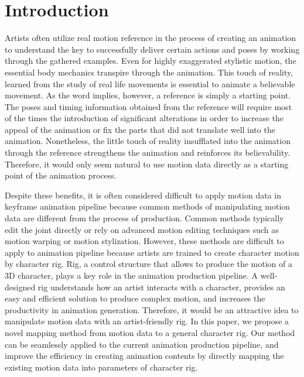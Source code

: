\section{Introduction}

Artists often utilize real motion reference in the process of creating an animation to understand the key to successfully deliver certain actions and poses by working through the gathered examples. 
Even for highly exaggerated stylistic motion, the essential body mechanics transpire through the animation. 
This touch of reality, learned from the study of real life movements is essential to animate a believable movement. 
As the word implies, however, a reference is simply a starting point. 
The poses and timing information obtained from the reference will require most of the times the introduction of significant alterations in order to increase the appeal of the animation or fix the parts that did not translate well into the animation. 
Nonetheless, the little touch of reality insufflated into the animation through the reference strengthens the animation and reinforces its believability. 
Therefore, it would only seem natural to use motion data directly as a starting point of the animation process.

Despite these benefits, it is often considered difficult to apply motion data in keyframe animation pipeline because common methods of manipulating motion data are different from the process of production. 
Common methods typically edit the joint directly or rely on advanced motion editing techniques such as motion warping\cite{witkin1995motion} or motion stylization\cite{hsu2005style}. 
However, these methods are difficult to apply to animation pipeline because artists are trained to create character motion by character rig.
Rig, a control structure that allows to produce the motion of a 3D character, plays a key role in the animation production pipeline. 
A well-designed rig understands how an artist interacts with a character, provides an easy and efficient solution to produce complex motion,  and increases the productivity in animation generation\cite{mclaughlin2011character,orvalho2012facial}. 
Therefore, it would be an attractive idea to manipulate motion data with an artist-friendly rig. 
In this paper, we propose a novel mapping method from motion data to a general character rig. 
Our method can be seamlessly applied to the current animation production pipeline, and improve the efficiency in creating animation contents by directly mapping the existing motion data into parameters of character rig.

